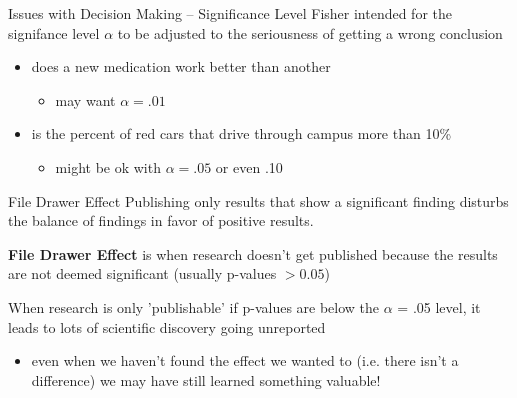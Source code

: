 \documentclass{beamer}
\begin{document}
\begin{frame}{Issues with Decision Making -- Significance Level}
Fisher intended for the signifance level $\alpha$ to be adjusted to the seriousness of getting a wrong conclusion
    \begin{itemize}
        \item does a new medication work better than another
        \begin{itemize}
            \item may want $\alpha = .01$
        \end{itemize}
        \item is the percent of red cars that drive through campus more than 10\%
        \begin{itemize}
            \item might be ok with $\alpha=.05$ or even .10
        \end{itemize}
    \end{itemize}    
\end{frame}

\begin{frame}{File Drawer Effect}
Publishing only results that show a significant finding disturbs the balance of findings in favor of positive results.\footnotemark
\vspace{4mm}

\textbf{File Drawer Effect} is when research doesn't get published because the results are not deemed significant (usually p-values $> 0.05$) \vspace{10mm}

When research is only 'publishable' if p-values are below the $\alpha$ = .05 level, it leads to lots of scientific discovery going unreported
\begin{itemize}
    \item even when we haven't found the effect we wanted to (i.e. there isn't a difference) we may have still learned something valuable!
\end{itemize}

\end{frame}
\end{document}
